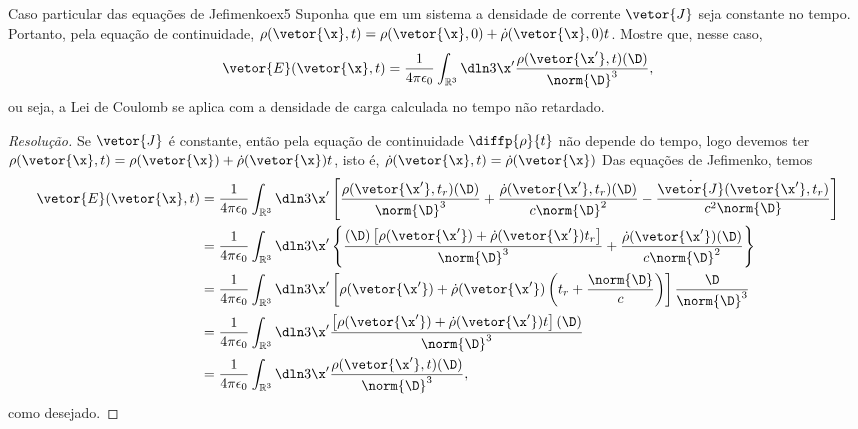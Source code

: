 \begin{exercício}{Caso particular das equações de Jefimenko}{ex5}
   Suponha que em um sistema a densidade de corrente \(\vetor{J}\) seja constante no tempo. Portanto, pela equação de continuidade, \(\rho(\vetor{\x}, t) = \rho(\vetor{\x}, 0) + \dot\rho(\vetor{\x}, 0)t\). Mostre que, nesse caso,
   \begin{equation*}
      \vetor{E}(\vetor{\x}, t) = \frac1{4\pi \epsilon_0} \int_{\mathbb{R}^3} \dln3{\x'} \frac{\rho(\vetor{\x'}, t) (\D)}{\norm{\D}^3},
   \end{equation*}
   ou seja, a Lei de Coulomb se aplica com a densidade de carga calculada no tempo não retardado.
\end{exercício}
\begin{proof}[Resolução]
   Se \(\vetor{J}\) é constante, então pela equação de continuidade \(\diffp{\rho}{t}\) não depende do tempo, logo devemos ter \(\rho(\vetor{\x}, t) = \rho(\vetor{\x}) + \dot\rho(\vetor{\x}) t\), isto é, \(\dot{\rho}(\vetor{\x}, t) = \dot\rho(\vetor{\x})\) Das equações de Jefimenko, temos
   \begin{align*}
      \vetor{E}(\vetor{\x},t) &= \frac{1}{4\pi \epsilon_0} \int_{\mathbb{R}^3} \dln3{\x'} \left[\frac{\rho(\vetor{\x'}, t_r) (\D)}{\norm{\D}^3} + \frac{\dot\rho(\vetor{\x'}, t_r) (\D)}{c\norm{\D}^2}- \frac{\dot{\vetor{J}}(\vetor{\x'}, t_r)}{c^2\norm{\D}}\right]\\
                              &= \frac{1}{4\pi \epsilon_0} \int_{\mathbb{R}^3} \dln3{\x'} \left\{\frac{(\D) \left[\rho(\vetor{\x'}) + \dot\rho(\vetor{\x'})t_r\right]}{\norm{\D}^3} + \frac{\dot\rho(\vetor{\x'}) (\D)}{c\norm{\D}^2}\right\}\\
                              &= \frac{1}{4\pi \epsilon_0} \int_{\mathbb{R}^3} \dln3{\x'} \left[\rho(\vetor{\x'}) + \dot\rho(\vetor{\x'}) \left(t_r + \frac{\norm{\D}}{c}\right)\right]\frac{\D}{\norm{\D}^3}\\
                              &= \frac{1}{4\pi \epsilon_0} \int_{\mathbb{R}^3} \dln3{\x'} \frac{\left[\rho(\vetor{\x'}) + \dot\rho(\vetor{\x'})t\right](\D)}{\norm{\D}^3}\\
                              &= \frac{1}{4\pi \epsilon_0} \int_{\mathbb{R}^3} \dln3{\x'} \frac{\rho(\vetor{\x'}, t) (\D)}{\norm{\D}^3},
   \end{align*}
   como desejado.
\end{proof}
